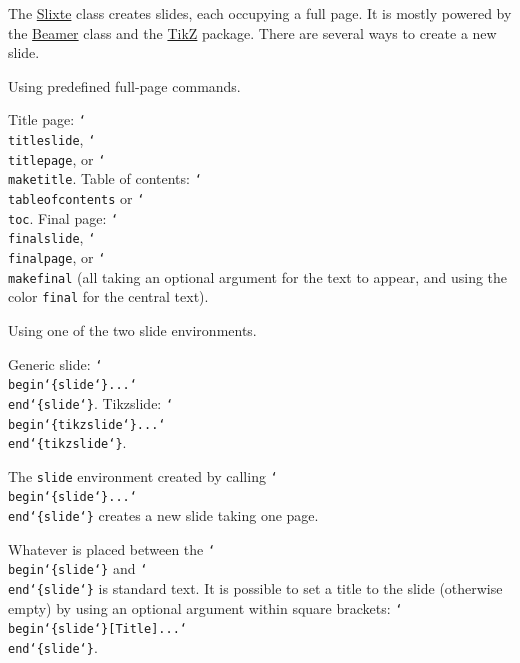 \documentclass{slixte}
\def\clsurl{https://ctan.org/pkg/slixte}
\newcommand{\codetext}[1]{\texttt{\color{second}#1}}
\newcommand{\cmdt}[1]{\char`\\#1}
\newcommand{\cbrl}{\char`\{}
\newcommand{\cbrr}{\char`\}}
\newcommand{\cbrt}[1]{\cbrl#1\cbrr}
\newcommand{\codeline}[2][0]{\spacing[0.1]\hspace{-1.2cm}\codetext{\foreach\i in {0,...,#1}{~~~~}#2}\par}
\newcommand{\slixte}{\href{\clsurl}{\color{first}Slixte}}
\newcommand{\beamer}{\href{https://ctan.org/pkg/beamer}{\color{first}Beamer}}
\newcommand{\tikzref}{\href{https://en.wikipedia.org/wiki/PGF/TikZ}{\color{first}TikZ}}
\begin{document}
\begin{slide}
    The \slixte{} class creates slides, each occupying a full page.
    It is mostly powered by the \beamer{} class and the \tikzref{} package.
    There are several ways to create a new slide.
    \begin{itemize}
        \fillitem Using predefined full-page commands.
        \begin{itemize}
            \emptyitem Title page: \codetext{\cmdt{titleslide}}, \codetext{\cmdt{titlepage}}, or \codetext{\cmdt{maketitle}}.
            \emptyitem Table of contents: \codetext{\cmdt{tableofcontents}} or \codetext{\cmdt{toc}}.
            \emptyitem Final page: \codetext{\cmdt{finalslide}}, \codetext{\cmdt{finalpage}}, or \codetext{\cmdt{makefinal}} (all taking an optional argument for the text to appear, and using the color \codetext{final} for the central text).
        \end{itemize}
        \fillitem Using one of the two slide environments.
        \begin{itemize}
            \emptyitem Generic slide: \codetext{\cmdt{begin}\cbrt{slide}...\cmdt{end}\cbrt{slide}}.
            \emptyitem Tikzslide: \codetext{\cmdt{begin}\cbrt{tikzslide}...\cmdt{end}\cbrt{tikzslide}}.
        \end{itemize}
    \end{itemize}
\end{slide}

\begin{slide}
    The \codetext{slide} environment created by calling \codetext{\cmdt{begin}\cbrt{slide}...\cmdt{end}\cbrt{slide}} creates a new slide taking one page.
    \begin{itemize}
        \fillitem Whatever is placed between the \codetext{\cmdt{begin}\cbrt{slide}} and \codetext{\cmdt{end}\cbrt{slide}} is standard text.
        \fillitem It is possible to set a title to the slide (otherwise empty) by using an optional argument within square brackets: \codetext{\cmdt{begin}\cbrt{slide}[Title]...\cmdt{end}\cbrt{slide}}.
    \end{itemize}

    \iftoggle{examples}{
    
    \spacing[1]

    Try adding the following code within your main document.

    \spacing

    \codeline{\cmdt{begin}\cbrt{slide}[A slide]}
    \codeline[1]{The text within the slide.}
    \codeline{\cmdt{end}\cbrt{slide}}
    }{}
\end{slide}
\end{document}
